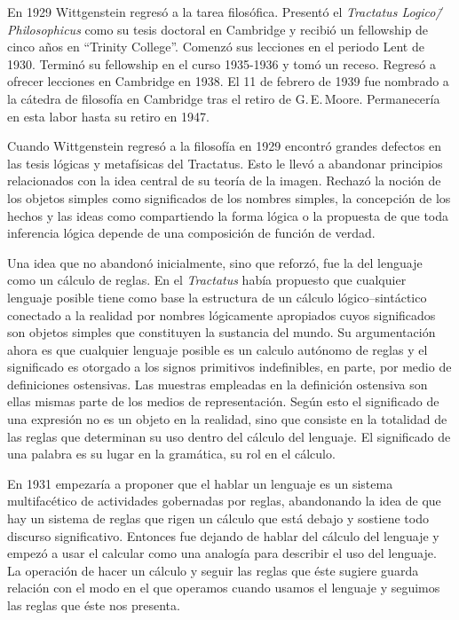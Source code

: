En 1929 Wittgenstein regresó a la tarea filosófica. Presentó el \emph{Tractatus
  Logico\=/Philosophicus} como su tesis doctoral en Cambridge y recibió un
fellowship de cinco años en ``Trinity College''. Comenzó sus lecciones en el
periodo Lent de 1930. Terminó su fellowship en el curso 1935-1936 y tomó un
receso. Regresó a ofrecer lecciones en Cambridge en 1938. El 11 de febrero de
1939 fue nombrado a la cátedra de filosofía en Cambridge tras el retiro de
G.\,E.\,Moore. Permanecería en esta labor hasta su retiro en 1947.

Cuando Wittgenstein regresó a la filosofía en 1929 encontró grandes defectos en
las tesis lógicas y metafísicas del Tractatus. Esto le llevó a abandonar
principios relacionados con la idea central de su teoría de la imagen. Rechazó
la noción de los objetos simples como significados de los nombres simples, la
concepción de los hechos y las ideas como compartiendo la forma lógica o la
propuesta de que toda inferencia lógica depende de una composición de función de
verdad\autocite[cf.][p.~44]{bakerhacker2014rules}.

Una idea que no abandonó inicialmente, sino que reforzó, fue la del lenguaje
como un cálculo de reglas. En el \emph{Tractatus} había propuesto que cualquier
lenguaje posible tiene como base la estructura de un cálculo lógico--sintáctico
conectado a la realidad por nombres lógicamente apropiados cuyos significados
son objetos simples que constituyen la sustancia del mundo. Su argumentación
ahora es que cualquier lenguaje posible es un calculo autónomo de reglas y el
significado es otorgado a los signos primitivos indefinibles, en parte, por
medio de definiciones ostensivas. Las muestras empleadas en la definición
ostensiva son ellas mismas parte de los medios de representación. Según esto el
significado de una expresión no es un objeto en la realidad, sino que consiste
en la totalidad de las reglas que determinan su uso dentro del cálculo del
lenguaje. El significado de una palabra es su lugar en la gramática, su rol en
el cálculo\autocite[cf.~][p.44]{bakerhacker2014rules}.

En 1931 empezaría a proponer que el hablar un lenguaje es un sistema
multifacético de actividades gobernadas por reglas, abandonando la idea de que
hay un sistema de reglas que rigen un cálculo que está debajo y sostiene todo
discurso significativo. Entonces fue dejando de hablar del cálculo del lenguaje
y empezó a usar el calcular como una analogía para describir el uso del
lenguaje. La operación de hacer un cálculo y seguir las reglas que éste sugiere
guarda relación con el modo en el que operamos cuando usamos el lenguaje y
seguimos las reglas que éste nos presenta.

